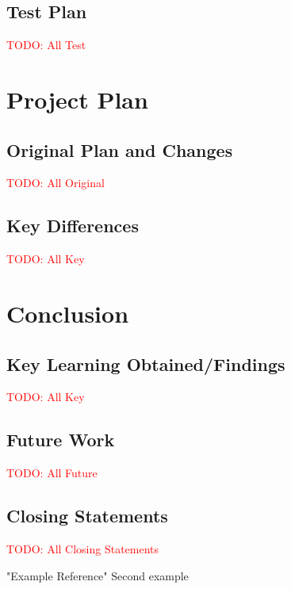 \documentclass[12pt]{article}
\begin{document}
    \subsection{Test Plan}
    \textcolor{red}{TODO: All Test}

    
\section{Project Plan}
    \subsection{Original Plan and Changes}
    \textcolor{red}{TODO: All Original}

    \subsection{Key Differences}
    \textcolor{red}{TODO: All Key}

    
\section{Conclusion}
    \subsection{Key Learning Obtained/Findings}
    \textcolor{red}{TODO: All Key}

    \subsection{Future Work}
    \textcolor{red}{TODO: All Future}

    \subsection{Closing Statements}
    \textcolor{red}{TODO: All Closing Statements}

    "Example Reference" \cite{adams1995hitchhiker} Second example



\end{document}
